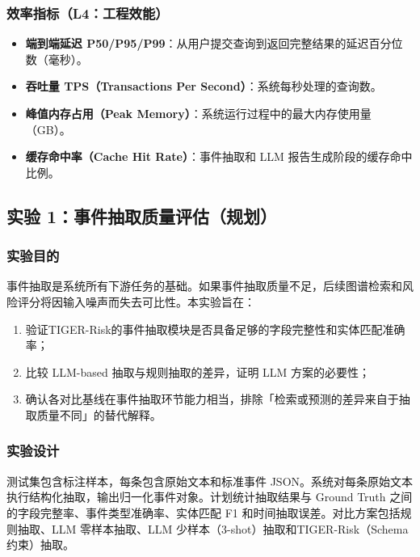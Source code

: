 \documentclass[12pt,a4paper]{article}
\newcommand{\projectshort}{TIGER-Risk}
\newcommand{\term}[1]{\textbf{#1}}
\begin{document}
\subsubsection{效率指标（L4：工程效能）}

\begin{itemize}
    \item \term{端到端延迟 P50/P95/P99}：从用户提交查询到返回完整结果的延迟百分位数（毫秒）。
    \item \term{吞吐量 TPS（Transactions Per Second）}：系统每秒处理的查询数。
    \item \term{峰值内存占用（Peak Memory）}：系统运行过程中的最大内存使用量（GB）。
    \item \term{缓存命中率（Cache Hit Rate）}：事件抽取和 LLM 报告生成阶段的缓存命中比例。
\end{itemize}

\subsection{实验 1：事件抽取质量评估（规划）}
\label{sec:exp-extraction}

\subsubsection{实验目的}

事件抽取是系统所有下游任务的基础。如果事件抽取质量不足，后续图谱检索和风险评分将因输入噪声而失去可比性。本实验旨在：
\begin{enumerate}
    \item 验证\projectshort 的事件抽取模块是否具备足够的字段完整性和实体匹配准确率；
    \item 比较 LLM-based 抽取与规则抽取的差异，证明 LLM 方案的必要性；
    \item 确认各对比基线在事件抽取环节能力相当，排除「检索或预测的差异来自于抽取质量不同」的替代解释。
\end{enumerate}

\subsubsection{实验设计}

测试集包含标注样本，每条包含原始文本和标准事件 JSON。系统对每条原始文本执行结构化抽取，输出归一化事件对象。计划统计抽取结果与 Ground Truth 之间的字段完整率、事件类型准确率、实体匹配 F1 和时间抽取误差。对比方案包括规则抽取、LLM 零样本抽取、LLM 少样本（3-shot）抽取和\projectshort（Schema 约束）抽取。
\end{document}
